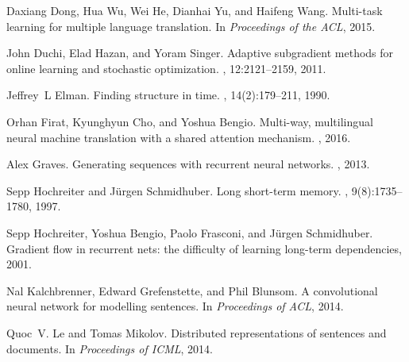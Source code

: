 \documentclass{article}
\begin{document}
\begin{thebibliography}{}
Daxiang Dong, Hua Wu, Wei He, Dianhai Yu, and Haifeng Wang.
\newblock Multi-task learning for multiple language translation.
\newblock In {\em Proceedings of the ACL}, 2015.

John Duchi, Elad Hazan, and Yoram Singer.
\newblock Adaptive subgradient methods for online learning and stochastic
  optimization.
, 12:2121--2159, 2011.

Jeffrey~L Elman.
\newblock Finding structure in time.
, 14(2):179--211, 1990.

Orhan Firat, Kyunghyun Cho, and Yoshua Bengio.
\newblock Multi-way, multilingual neural machine translation with a shared
  attention mechanism.
, 2016.

Alex Graves.
\newblock Generating sequences with recurrent neural networks.
, 2013.

Sepp Hochreiter and J{\"u}rgen Schmidhuber.
\newblock Long short-term memory.
, 9(8):1735--1780, 1997.

Sepp Hochreiter, Yoshua Bengio, Paolo Frasconi, and J{\"u}rgen Schmidhuber.
\newblock Gradient flow in recurrent nets: the difficulty of learning long-term
  dependencies, 2001.

Nal Kalchbrenner, Edward Grefenstette, and Phil Blunsom.
\newblock A convolutional neural network for modelling sentences.
\newblock In {\em Proceedings of ACL}, 2014.

Quoc~V. Le and Tomas Mikolov.
\newblock Distributed representations of sentences and documents.
\newblock In {\em Proceedings of ICML}, 2014.


\end{thebibliography}
\end{document}
